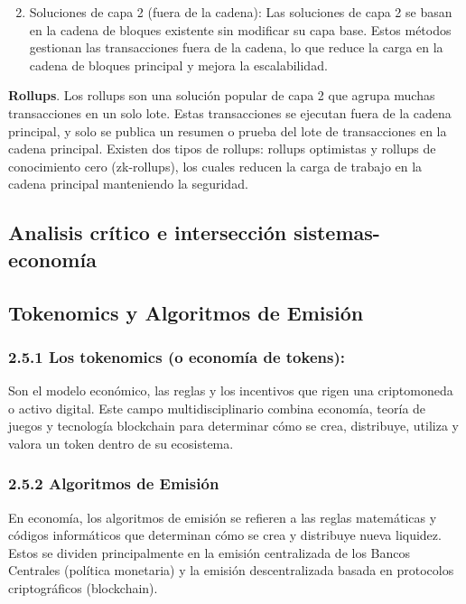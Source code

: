 \documentclass[12pt,a4paper]{article}
\begin{document}
\begin{enumerate}[label=\alph*.]
    \setcounter{enumi}{1}
    \item Soluciones de capa 2 (fuera de la cadena): Las soluciones de capa 2 se basan en la
    cadena de bloques existente sin modificar su capa base. Estos métodos gestionan
    las transacciones fuera de la cadena, lo que reduce la carga en la cadena de
    bloques principal y mejora la escalabilidad.
\end{enumerate}

\textbf{Rollups}. Los rollups son una solución popular de capa 2 que agrupa muchas transacciones
en un solo lote. Estas transacciones se ejecutan fuera de la cadena principal, y solo se
publica un resumen o prueba del lote de transacciones en la cadena principal. Existen dos
tipos de rollups: rollups optimistas y rollups de conocimiento cero (zk-rollups), los cuales
reducen la carga de trabajo en la cadena principal manteniendo la seguridad.

\subsection{Analisis crítico e intersección sistemas-economía}

\subsection*{Tokenomics y Algoritmos de Emisión}

\subsubsection*{2.5.1 Los tokenomics (o economía de tokens):}

Son el modelo económico, las reglas y los incentivos que rigen una criptomoneda o activo
digital. Este campo multidisciplinario combina economía, teoría de juegos y tecnología
blockchain para determinar cómo se crea, distribuye, utiliza y valora un token dentro de su
ecosistema.

\subsubsection*{2.5.2 Algoritmos de Emisión}

En economía, los algoritmos de emisión se refieren a las reglas matemáticas y códigos
informáticos que determinan cómo se crea y distribuye nueva liquidez. Estos se dividen
principalmente en la emisión centralizada de los Bancos Centrales (política monetaria) y la
emisión descentralizada basada en protocolos criptográficos (blockchain).
\end{document}
